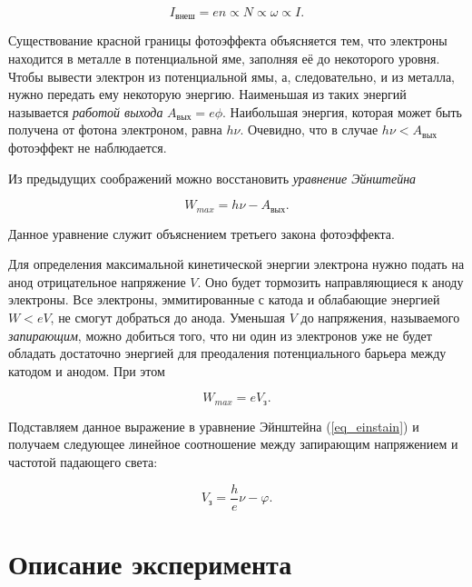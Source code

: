 \documentclass[12pt]{article}
\begin{document}
	\begin{equation}
	 	I_\text{внеш} = en \propto N \propto \omega \propto I. 
	\end{equation} 

	\par Существование красной границы фотоэффекта объясняется тем, что электроны находится в металле в потенциальной яме, заполняя её до некоторого уровня. Чтобы вывести электрон из потенциальной ямы, а, следовательно, и из металла, нужно передать ему некоторую энергию. Наименьшая из таких энергий называется \emph{работой выхода} $A_{\text{вых}} =e\phi$.	Наибольшая энергия, которая может быть получена от фотона электроном, равна $h\nu$. Очевидно, что в случае $h\nu < A_{\text{вых}}$ фотоэффект не наблюдается.

	\par Из предыдущих соображений можно восстановить \emph{уравнение Эйнштейна}

	\begin{equation}\label{eq_einstain}
		W_{max} = h\nu - A_{\text{вых}}.
	\end{equation}

	Данное уравнение служит объяснением третьего закона фотоэффекта. 

	\par Для определения максимальной кинетической энергии электрона нужно подать на анод отрицательное напряжение $V$. Оно будет тормозить направляющиеся к аноду электроны. Все электроны, эммитированные с катода и облабающие энергией $W < eV$, не смогут добраться до анода. Уменьшая $V$ до напряжения, называемого \emph{запирающим}, можно добиться того, что ни один из электронов уже не будет обладать достаточно энергией для преодаления потенциального барьера между катодом и анодом. При этом 

	\begin{equation}
	 	W_{max} = e V_{\text{з}}.
	\end{equation} 

	Подставляем данное выражение в уравнение Эйнштейна (\ref{eq_einstain}) и получаем следующее линейное соотношение между запирающим напряжением и частотой падающего света:

	\begin{equation}
		V_{\text{з}} = \dfrac{h}{e}\nu - \varphi.
	\end{equation}

	\section{Описание эксперимента} %
	\label{sec:exp_review}
	
\end{document}
